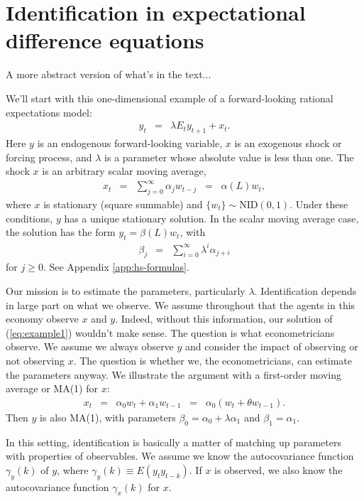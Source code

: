\documentclass[11pt]{article}
\begin{document}
{\section{Identification in expectational difference equations}

A more abstract version of what's in the text...

We'll start with this one-dimensional example of a forward-looking
rational expectations model:
\begin{eqnarray}
    y_t &=& \lambda E_t y_{t+1} + x_t .
    \label{eq:example1}
\end{eqnarray}
Here $y$ is an endogenous forward-looking variable,
$x$ is an exogenous shock or forcing process,
and $\lambda$ is a parameter whose absolute value is less than one.
The shock $x$ is an arbitrary scalar moving average,
\begin{eqnarray*}
    x_t &=& \sum_{j=0}^\infty \alpha_j w_{t-j} \;\;=\;\; \alpha(L) w_t ,
\end{eqnarray*}
where $x$ is stationary (square summable) and
$ \{ w_t \} \sim \mbox{NID}(0,1) $.
Under these conditions, $y$ has a unique stationary solution.
In the scalar moving average case, the solution has the form
$  y_t = \beta(L) w_t  $,
with
\begin{eqnarray*}
    \beta_j &=& \sum_{i=0}^\infty \lambda^i \alpha_{j+i}
\end{eqnarray*}
for $j\geq 0$.
See Appendix \ref{app:hs-formulas}.

Our mission is to estimate the parameters,
particularly $\lambda$.
Identification depends in large part on what we observe.
We assume throughout that the agents in this economy
observe $x$ and $y$.
Indeed, without this information, our solution
of (\ref{eq:example1}) wouldn't make sense.
The question is what econometricians observe.
We assume we always observe $y$ and consider
the impact of observing or not observing $x$.
The question is whether we, the econometricians,
can estimate the parameters anyway.
We illustrate the argument with a first-order
moving average or MA(1) for $x$:
\begin{eqnarray*}
    x_t &=& \alpha_0 w_t + \alpha_1 w_{t-1}
        \;\;=\;\; \alpha_{0} (w_t + \theta w_{t-1}) .
\end{eqnarray*}
Then $y$ is also MA(1),
with parameters $\beta_0 = \alpha_0 + \lambda \alpha_1$ and $\beta_1 = \alpha_1$.

In this setting, identification is basically a matter of
matching up parameters with properties of observables.
We assume we know the autocovariance function $\gamma_y(k)$ of $y$,
where $\gamma_y(k) \equiv E (y_t y_{t-k}) $.
If $x$ is observed, we also know the autocovariance  function
$\gamma_x(k)$ for $x$.


}
\end{document}
